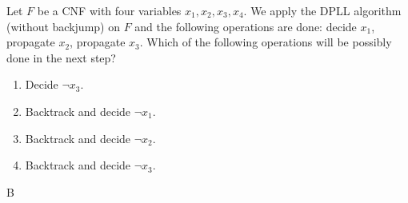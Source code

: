 \documentclass[11pt,a4paper]{article}
\begin{document}
\subproblem Let $F$ be a CNF with four variables $x_1, x_2, x_3, x_4$.
We apply the DPLL algorithm (without backjump) on $F$ and the following operations are done:
decide $x_1$, propagate $x_2$, propagate $x_3$.
Which of the following operations will be possibly done in the next step?

\begin{enumerate}[label=(\Alph*)]
    \item Decide $\lnot x_3$.
    \item Backtrack and decide $\lnot x_1$.
    \item Backtrack and decide $\lnot x_2$.
    \item Backtrack and decide $\lnot x_3$.
\end{enumerate}

\begin{solution}
    B
\end{solution}

\newpage
{}
\end{document}
